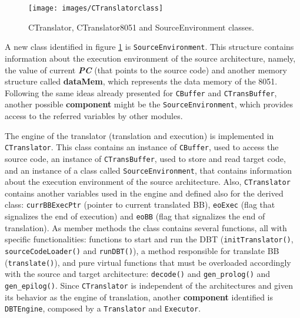 \begin{figure}[!htb]
\centerline{
\texttt{[image: images/CTranslatorclass]}}
\caption{CTranslator, CTranslator8051 and SourceEnvironment classes.}
\label{fig:translatorclass} 
\end{figure}


A new class identified in figure \ref{fig:translatorclass} is \texttt{SourceEnvironment}. This structure contains information about the execution environment of the source architecture, namely, the value of current \textbf{\textit{PC}} (that points to the source code) and another memory structure called \textbf{dataMem}, which represents the data memory of the 8051. Following the same ideas already presented for \texttt{CBuffer} and \texttt{CTransBuffer}, another possible \textbf{component} might be the \texttt{SourceEnvironment}, which provides access to the referred variables by other modules. 

The engine of the translator (translation and execution) is implemented in \texttt{CTranslator}. This class contains an instance of \texttt{CBuffer}, used to access the source code, an instance of \texttt{CTransBuffer}, used to store and read target code, and an instance of a class called \texttt{SourceEnvironment}, that contains information about the execution environment of the source architecture. Also, \texttt{CTranslator} contains another variables used in the engine and defined also for the derived class: \texttt{currBBExecPtr} (pointer to current translated BB), \texttt{eoExec} (flag that signalizes the end of execution) and \texttt{eoBB} (flag that signalizes the end of translation). As member methods the class contains several functions, all with specific functionalities: functions to start and run the DBT (\texttt{initTranslator()}, \texttt{sourceCodeLoader()} and \texttt{runDBT()}), a method responsible for translate BB (\texttt{translate()}), and pure virtual functions that must be overloaded accordingly with the source and target architecture: \texttt{decode()} and \texttt{gen\_prolog()} and \texttt{gen\_epilog()}. Since \texttt{CTranslator} is independent of the architectures and given its behavior as the engine of translation, another \textbf{component} identified is \texttt{DBTEngine}, composed by a \texttt{Translator} and \texttt{Executor}. 

